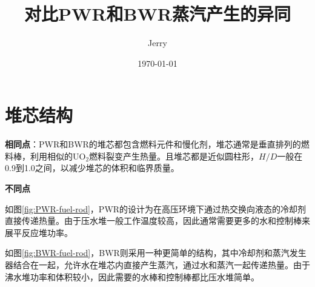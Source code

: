\documentclass{article}
\title{\bf\huge 对比PWR和BWR蒸汽产生的异同}
\author{Jerry}
\date{\today}
\begin{document}
\fancyfoot[C]{\thepage}

\maketitle
\tableofcontents

\section{堆芯结构}

\textbf{相同点}：PWR和BWR的堆芯都包含燃料元件和慢化剂，堆芯通常是垂直排列的燃料棒，利用相似的UO$_2$燃料裂变产生热量。且堆芯都是近似圆柱形，$H/D$一般在0.9到1.0之间，以减少堆芯的体积和临界质量。

\textbf{不同点}

如图\ref{fig:PWR-fuel-rod}，PWR的设计为在高压环境下通过热交换向液态的冷却剂直接传递热量。由于压水堆一般工作温度较高，因此通常需要更多的水和控制棒来展平反应堆功率。

如图\ref{fig:BWR-fuel-rod}，BWR则采用一种更简单的结构，其中冷却剂和蒸汽发生器结合在一起，允许水在堆芯内直接产生蒸汽，通过水和蒸汽一起传递热量。由于沸水堆功率和体积较小，因此需要的水棒和控制棒都比压水堆简单。
\end{document}
